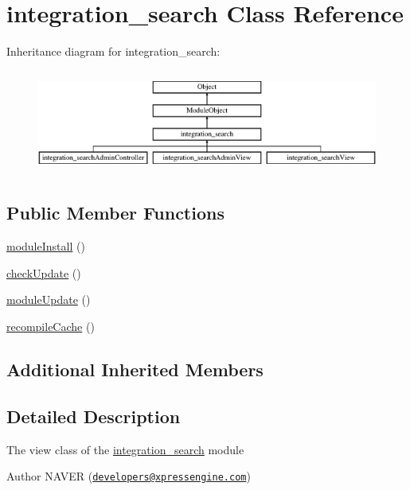 \hypertarget{classintegration__search}{}\section{integration\+\_\+search Class Reference}
\label{classintegration__search}
Inheritance diagram for integration\+\_\+search\+:\begin{figure}[H]
\begin{center}
\leavevmode
\includegraphics[height=3.456790cm]{classintegration__search}
\end{center}
\end{figure}
\subsection*{Public Member Functions}
\begin{DoxyCompactItemize}
\item 
\hyperlink{classintegration__search_a04d168bf88a4f95b6f4bd24854538d87}{module\+Install} ()
\item 
\hyperlink{classintegration__search_a998b55202e7ea75389e2ab8f640b374d}{check\+Update} ()
\item 
\hyperlink{classintegration__search_a4a0b59c788e9240fada3131b35ef273c}{module\+Update} ()
\item 
\hyperlink{classintegration__search_aaa47663580bb0ec22cf7b419ad47f2af}{recompile\+Cache} ()
\end{DoxyCompactItemize}
\subsection*{Additional Inherited Members}


\subsection{Detailed Description}
The view class of the \hyperlink{classintegration__search}{integration\+\_\+search} module

\begin{DoxyAuthor}{Author}
N\+A\+V\+ER (\href{mailto:developers@xpressengine.com}{\tt developers@xpressengine.\+com}) 
\end{DoxyAuthor}


